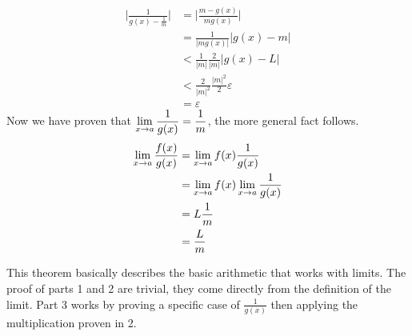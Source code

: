 \documentclass[12pt]{article}
\begin{document}
\begin{prf}{}
\begin{enumerate}
    \begin{align*}
        \bigg\vert\frac{1}{g(x) - \frac{1}{m}}\bigg\vert &= \bigg\vert\frac{m - g(x)}{mg(x)}\bigg\vert\\
        &= \frac{1}{|mg(x)|}|g(x) - m|\\
        &< \frac{1}{|m|}\frac{2}{|m|}|g(x) - L|\\
        &< \frac{2}{|m|^2}\frac{|m|^2}{2}\varepsilon\\
        &= \varepsilon
    \end{align*}
    Now we have proven that \(\displaystyle\lim_{x\to a} \frac{1}{g(x)} = \frac{1}{m}\), the more general fact follows.\\
    \begin{align*}
        \displaystyle\lim_{x\to a} \frac{f(x)}{g(x)} &=  \displaystyle\lim_{x\to a} f(x) \frac{1}{g(x)}\\
        &= \displaystyle\lim_{x\to a} f(x)\displaystyle\lim_{x\to a}\frac{1}{g(x)}\\
        &= L\frac{1}{m}\\
        &= \frac{L}{m}
    \end{align*}
\end{enumerate}   
\end{prf}
\begin{explanation}{}
    This theorem basically describes the basic arithmetic that works with limits. The proof of parts 1 and 2 are trivial, they come directly from the definition of the limit. Part 3 works by proving a specific case of $\frac{1}{g(x)}$ then applying the multiplication proven in 2.
\end{explanation}
\end{document}
